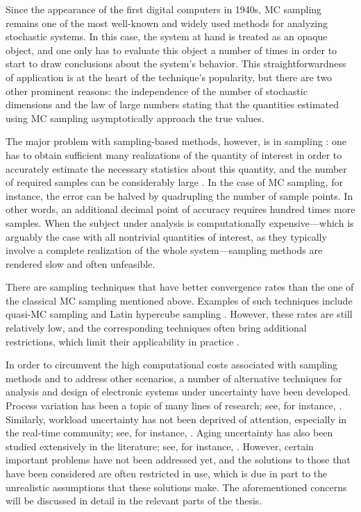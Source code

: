 Since the appearance of the first digital computers in 1940s, \ac{MC} sampling
remains one of the most well-known and widely used methods for analyzing
stochastic systems. In this case, the system at hand is treated as an opaque
object, and one only has to evaluate this object a number of times in order to
start to draw conclusions about the system's behavior. This straightforwardness
of application is at the heart of the technique's popularity, but there are two
other prominent reasons: the independence of the number of stochastic dimensions
and the law of large numbers \cite{durrett2010} stating that the quantities
estimated using \ac{MC} sampling asymptotically approach the true values.

The major problem with sampling-based methods, however, is in sampling \perse:
one has to obtain sufficient many realizations of the quantity of interest in
order to accurately estimate the necessary statistics about this quantity, and
the number of required samples can be considerably large
\cite{diaz-emparanza2002}. In the case of \ac{MC} sampling, for instance, the
error can be halved by quadrupling the number of sample points. In other words,
an additional decimal point of accuracy requires hundred times more samples.
When the subject under analysis is computationally expensive---which is arguably
the case with all nontrivial quantities of interest, as they typically involve a
complete realization of the whole system---sampling methods are rendered slow
and often unfeasible.

There are sampling techniques that have better convergence rates than the one of
the classical \ac{MC} sampling mentioned above. Examples of such techniques
include quasi-\ac{MC} sampling and Latin hypercube sampling \cite{asmussen2007}.
However, these rates are still relatively low, and the corresponding techniques
often bring additional restrictions, which limit their applicability in practice
\cite{xiu2010}.

In order to circumvent the high computational costs associated with sampling
methods and to address other scenarios, a number of alternative techniques for
analysis and design of electronic systems under uncertainty have been developed.
Process variation has been a topic of many lines of research; see, for instance,
\cite{bhardwaj2006, vrudhula2006, bhardwaj2008, chandra2010, juan2012, lee2013}.
Similarly, workload uncertainty has not been deprived of attention, especially
in the real-time community; see, for instance, \cite{diaz2002, zhu2008,
schranzhofer2009, santinelli2011, quinton2012, tanasa2015}. Aging uncertainty
has also been studied extensively in the literature; see, for instance,
\cite{coskun2006, huang2009b, oboril2012, firouzi2013, kiamehr2013, das2014c}.
However, certain important problems have not been addressed yet, and the
solutions to those that have been considered are often restricted in use, which
is due in part to the unrealistic assumptions that these solutions make. The
aforementioned concerns will be discussed in detail in the relevant parts of the
thesis.
